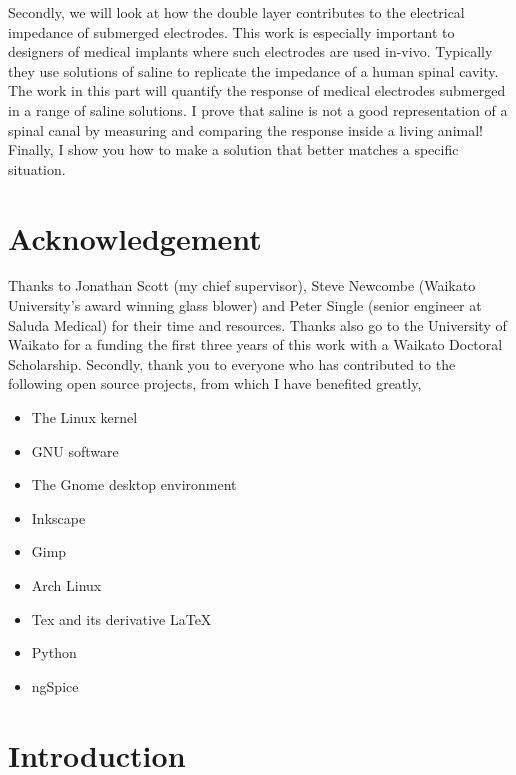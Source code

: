   Secondly, we will look at how the double layer contributes to the electrical impedance of submerged electrodes.
  This work is especially important to designers of medical implants where such electrodes are used in-vivo.
  Typically they use solutions of saline to replicate the impedance of a human spinal cavity.
  The work in this part will quantify the response of medical electrodes submerged in a range of saline solutions.
  I prove that saline is not a good representation of a spinal canal by measuring and comparing the response inside a living animal!
  Finally, I show you how to make a solution that better matches a specific situation.


\chapter*{Acknowledgement}
Thanks to Jonathan Scott (my chief supervisor), Steve Newcombe (Waikato University's award winning glass blower) and Peter Single (senior engineer at Saluda Medical) for their time and resources. Thanks also go to the University of Waikato for a funding the first three years of this work with a Waikato Doctoral Scholarship.
Secondly, thank you to everyone who has contributed to the following open source projects, from which I have benefited greatly,
\begin{itemize}
\item The Linux kernel
\item GNU software
\item The Gnome desktop environment
\item Inkscape
\item Gimp
\item Arch Linux
\item Tex and its derivative \LaTeX
\item Python
\item ngSpice
\end{itemize}

\tableofcontents{}
\listoffigures
\listoftables
\doublespacing



\chapter{Introduction}
  

